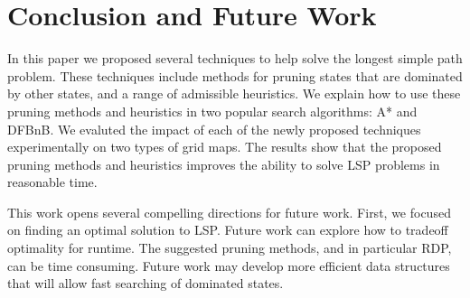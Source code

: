\documentclass[letterpaper]{article} %
\begin{document}
\section{Conclusion and Future Work}

In this paper we proposed several techniques to help solve the longest simple path problem. These techniques include 
methods for pruning states that are dominated by other states, and a range of admissible heuristics. We explain how to use these pruning methods and heuristics in two popular search algorithms: A* and DFBnB. 
We evaluted the impact of each of the newly proposed techniques experimentally on two types of grid maps. The results show that the proposed pruning methods and heuristics improves the ability to solve LSP problems in reasonable time. 

This work opens several compelling directions for future work. First, we focused on finding an optimal solution to LSP. Future work can explore how to tradeoff optimality for runtime. 
The suggested pruning methods, and in particular RDP, can be time consuming. Future work may develop more efficient data structures that will allow fast searching of dominated states. %





\end{document}
